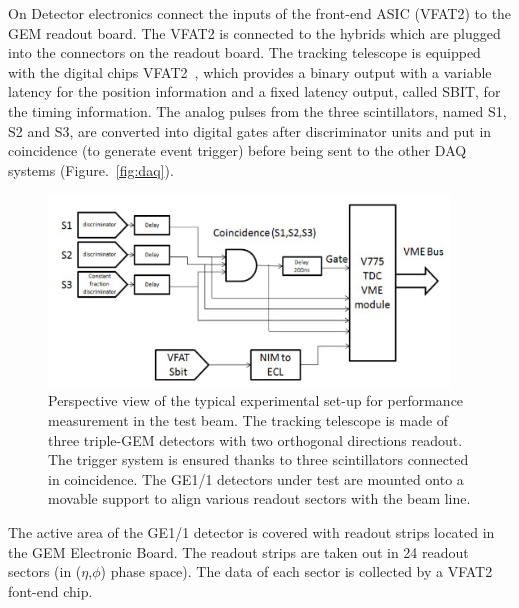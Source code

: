 On Detector electronics connect the inputs of the front-end ASIC (VFAT2) to the GEM readout board.
The VFAT2 is connected to the hybrids which are plugged into the connectors on the readout board.
The tracking telescope is equipped with the digital chips VFAT2~\cite{Aspell:2008zz}, which provides a binary output with a variable latency for the position information and a fixed latency output, called SBIT, for the timing information.
The analog pulses from the three scintillators, named S1, S2 and S3, are converted into digital gates after discriminator units and put in coincidence (to generate event trigger) before being sent to the other DAQ systems (Figure.~\ref{fig:daq}).
\begin{figure}[!htbp]
\centering
\includegraphics[width=0.95\textwidth]{figures/GEM/daq.png}
\caption{Perspective view of the typical experimental set-up for performance measurement in the test beam. The tracking telescope is made of three triple-GEM detectors with two orthogonal directions readout. The trigger system is ensured thanks to three scintillators connected in coincidence. The GE1/1 detectors under test are mounted onto a movable support to align various readout sectors with the beam line.}\label{fig:tbs}
\end{figure}
The active area of the GE1/1 detector is covered with readout strips located in the GEM Electronic Board. 
The readout strips are taken out in 24 readout sectors (in ($\eta$,$\phi$) phase space).
The data of each sector is collected by a VFAT2 font-end chip. 

